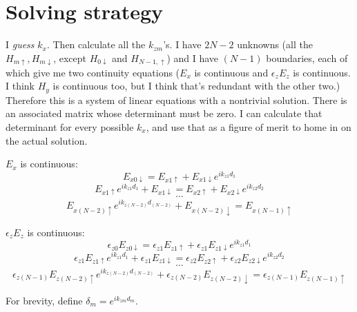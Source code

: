 \documentclass[12pt]{article}
\renewcommand{\(}{\left(}
\renewcommand{\)}{\right)}
\newcommand{\e}{\epsilon}
\begin{document}
\section{Solving strategy}

I \emph{guess} $k_x$. Then calculate all the $k_{zm}$'s. I have $2N-2$ unknowns (all the $H_{m\uparrow}, H_{m\downarrow}$, except $H_{0\downarrow}$ and $H_{N-1,\uparrow}$) and I have $(N-1)$ boundaries, each of which give me two continuity equations ($E_x$ is continuous and $\e_z E_z$ is continuous. I think $H_y$ is continuous too, but I think that's redundant with the other two.) Therefore this is a system of linear equations with a nontrivial solution. There is an associated matrix whose determinant must be zero. I can calculate that determinant for every possible $k_x$, and use that as a figure of merit to home in on the actual solution.

$E_x$ is continuous:
$$E_{x0\downarrow} = E_{x1\uparrow} + E_{x1\downarrow}e^{i k_{z1} d_1}$$
$$E_{x1\uparrow} e^{i k_{z1} d_1} + E_{x1\downarrow} = E_{x2\uparrow} + E_{x2\downarrow}e^{i k_{z2} d_2}$$
$$\cdots$$
$$E_{x(N-2)\uparrow} e^{i k_{z(N-2)} d_{(N-2)}} + E_{x(N-2)\downarrow} = E_{x(N-1)\uparrow}$$

$\e_z E_z$ is continuous:
$$\e_{z0}E_{z0\downarrow} = \e_{z1} E_{z1\uparrow} + \e_{z1} E_{z1\downarrow}e^{i k_{z1} d_1}$$
$$\e_{z1} E_{z1\uparrow} e^{i k_{z1} d_1} + \e_{z1} E_{z1\downarrow} = \e_{z2} E_{z2\uparrow} + \e_{z2} E_{z2\downarrow}e^{i k_{z2} d_2}$$
$$\cdots$$
$$\e_{z(N-1)} E_{z(N-2)\uparrow} e^{i k_{z(N-2)} d_{(N-2)}} + \e_{z(N-2)} E_{z(N-2)\downarrow} = \e_{z(N-1)} E_{z(N-1)\uparrow}$$

For brevity, define $\delta_m = e^{i k_{zm} d_m}$.
\end{document}
